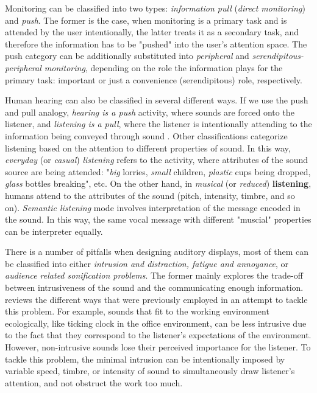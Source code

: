 Monitoring can be classified into two types: \textit{information pull} (\textit{direct monitoring}) and \textit{push}. The former is the case, when monitoring is a primary task and is attended by the user intentionally, the latter treats it as a secondary task, and therefore the information has to be "pushed" into the user's attention space. The push category can be additionally substituted into \textit{peripheral} and \textit{serendipitous-peripheral monitoring}, depending on the role the information plays for the primary task: important or just a convenience (serendipitous) role, respectively.

Human hearing can also be classified in several different ways. If we use the push and pull analogy, \textit{hearing is a push} activity, where sounds are forced onto the listener, and \textit{listening is a pull}, where the listener is intentionally attending to the information being conveyed through sound \parencite{hermann_sonification_2011}. Other classifications categorize listening based on the attention to different properties of sound. In this way, \textit{everyday} (or \textit{casual}) \textit{listening} refers to the activity, where attributes of the sound source are being attended: "\textit{big} lorries, \textit{small }children, \textit{plastic }cups being dropped, \textit{glass }bottles breaking", etc. On the other hand, in \textit{musical} (or \textit{reduced}) \textbf{listening}, humans attend to the attributes of the sound (pitch, intensity, timbre, and so on). \textit{Semantic listening} mode involves interpretation of the message encoded in the sound. In this way, the same vocal message with different "muscial" properties can be interpreter equally.


There is a number of pitfalls when designing auditory displays, most of them can be classified into either \textit{intrusion and distraction, fatigue and annoyance}, or \textit{audience related sonification problems}.
The former mainly explores the trade-off between intrusiveness of the sound and the communicating enough information. \parencite{hermann_sonification_2011} reviews the different ways that were previously employed in an attempt to tackle this problem. For example, sounds that fit to the working environment ecologically, like ticking clock in the office environment, can be less intrusive due to the fact that they correspond to the listener's expectations of the environment. However, non-intrusive sounds lose their perceived importance for the listener. To tackle this problem, the minimal intrusion can be intentionally imposed by variable speed, timbre, or intensity of sound to simultaneously draw listener's attention, and not obstruct the work too much.


